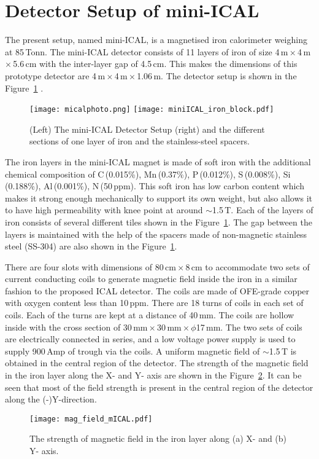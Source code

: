 \section{Detector Setup of mini-ICAL}
The present setup, named mini-ICAL, is a magnetised iron calorimeter
weighing at 85\,Tonn. The mini-ICAL detector consists of 11 layers
of iron of size 4\,m\,$\times$\,4\,m\,$\times$\,5.6\,cm with the
inter-layer gap of 4.5\,cm. This makes the dimensions of this
prototype detector are 4\,m\,$\times$\,4\,m\,$\times$\,1.06\,m.
The detector setup is shown in the Figure~\ref{fig:miniICAL_iron}
.
\begin{figure}[h]
  \centering
  \texttt{[image: micalphoto.png]}
  \texttt{[image: miniICAL\_iron\_block.pdf]}
  \caption{(Left) The mini-ICAL Detector Setup (right) and the
    different sections of one layer of iron and the stainless-steel
    spacers.}
  \label{fig:miniICAL_iron}
\end{figure}
The iron layers in the mini-ICAL magnet is made of soft iron with
the additional chemical composition of C\,(0.015\%), Mn\,(0.37\%),
P\,(0.012\%), S\,(0.008\%), Si\,(0.188\%), Al\,(0.001\%), N\,(50\,ppm). %
This soft iron has low carbon content which makes it strong enough
mechanically to support its own weight, but also allows it to have high
permeability with knee point at around $\sim$1.5\,T.
Each of the layers of iron consists of several different tiles shown
in the Figure~\ref{fig:miniICAL_iron}.
The gap between the layers is maintained with the help of the spacers
made of non-magnetic stainless steel (SS-304) are also shown in the
Figure~\ref{fig:miniICAL_iron}.

There are four slots with dimensions of 80\,cm\,$\times$\,8\,cm to
accommodate two sets of current conducting coils to generate magnetic
field inside the iron in a similar fashion to the proposed
ICAL detector. The coils are made of OFE-grade copper with
oxygen content less than 10\,ppm. There are 18 turns of coils in each
set of coils. Each of the turns are kept at a distance of 40\,mm.
The coils are hollow inside with the cross section of
30\,mm\,$\times$\,30\,mm\,$\times$\,$\phi$17\,mm.
The two sets of coils are electrically connected in series,
and a low voltage power supply is used to supply 900\,Amp
of trough via the coils. A uniform magnetic field of $\sim$1.5\,T
is obtained in the central region of the detector.
The strength of the magnetic field in the iron layer along the X- and Y-
axis are shown in the Figure~\ref{fig:magfieldmical}. It can be seen
that most of the field strength is present in the central region of the
detector along the (-)Y-direction.
\begin{figure}[h]
  \centering
  \texttt{[image: mag\_field\_mICAL.pdf]}
  \caption{The strength of magnetic field in the iron layer along (a) X-
    and (b) Y- axis.}
  \label{fig:magfieldmical}
\end{figure}

